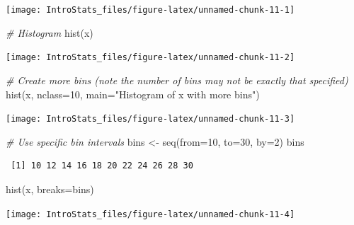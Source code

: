 \documentclass[
  oneside]{krantz}
\newenvironment{Shaded}{\begin{snugshade}}{\end{snugshade}}
\newcommand{\AttributeTok}[1]{\textcolor[rgb]{0.77,0.63,0.00}{#1}}
\newcommand{\CommentTok}[1]{\textcolor[rgb]{0.56,0.35,0.01}{\textit{#1}}}
\newcommand{\DecValTok}[1]{\textcolor[rgb]{0.00,0.00,0.81}{#1}}
\newcommand{\FunctionTok}[1]{\textcolor[rgb]{0.00,0.00,0.00}{#1}}
\newcommand{\NormalTok}[1]{#1}
\newcommand{\OtherTok}[1]{\textcolor[rgb]{0.56,0.35,0.01}{#1}}
\newcommand{\StringTok}[1]{\textcolor[rgb]{0.31,0.60,0.02}{#1}}
\begin{document}
\begin{center}\texttt{[image: IntroStats\_files/figure-latex/unnamed-chunk-11-1]} \end{center}

\begin{Shaded}
\begin{Highlighting}[]
\CommentTok{\# Histogram}
\FunctionTok{hist}\NormalTok{(x)}
\end{Highlighting}
\end{Shaded}

\begin{center}\texttt{[image: IntroStats\_files/figure-latex/unnamed-chunk-11-2]} \end{center}

\begin{Shaded}
\begin{Highlighting}[]
\CommentTok{\# Create more bins (note the number of bins may not be exactly that specified)}
\FunctionTok{hist}\NormalTok{(x, }\AttributeTok{nclass=}\DecValTok{10}\NormalTok{, }\AttributeTok{main=}\StringTok{"Histogram of x with more bins"}\NormalTok{)}
\end{Highlighting}
\end{Shaded}

\begin{center}\texttt{[image: IntroStats\_files/figure-latex/unnamed-chunk-11-3]} \end{center}

\begin{Shaded}
\begin{Highlighting}[]
\CommentTok{\# Use specific bin intervals}
\NormalTok{bins }\OtherTok{\textless{}{-}} \FunctionTok{seq}\NormalTok{(}\AttributeTok{from=}\DecValTok{10}\NormalTok{, }\AttributeTok{to=}\DecValTok{30}\NormalTok{, }\AttributeTok{by=}\DecValTok{2}\NormalTok{)}
\NormalTok{bins}
\end{Highlighting}
\end{Shaded}

\begin{verbatim}
 [1] 10 12 14 16 18 20 22 24 26 28 30
\end{verbatim}

\begin{Shaded}
\begin{Highlighting}[]
\FunctionTok{hist}\NormalTok{(x, }\AttributeTok{breaks=}\NormalTok{bins)}
\end{Highlighting}
\end{Shaded}

\begin{center}\texttt{[image: IntroStats\_files/figure-latex/unnamed-chunk-11-4]} \end{center}
\end{document}
